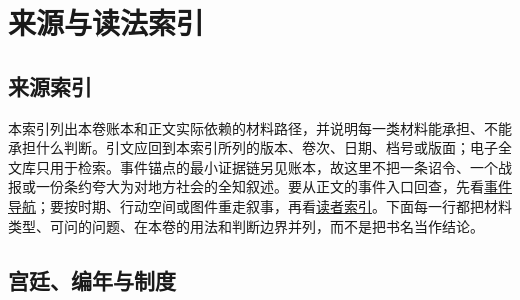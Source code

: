 \chapter{来源与读法索引}
\label{app:sources}

\section*{来源索引}
\label{app:source-index}

本索引列出本卷账本和正文实际依赖的材料路径，并说明每一类材料能承担、不能承担什么判断。引文应回到本索引所列的版本、卷次、日期、档号或版面；电子全文库只用于检索。事件锚点的最小证据链另见账本，故这里不把一条诏令、一个战报或一份条约夸大为对地方社会的全知叙述。要从正文的事件入口回查，先看\hyperref[app:event-navigation]{事件导航}；要按时期、行动空间或图件重走叙事，再看\hyperref[app:index]{读者索引}。下面每一行都把材料类型、可问的问题、在本卷的用法和判断边界并列，而不是把书名当作结论。

\section{宫廷、编年与制度}

